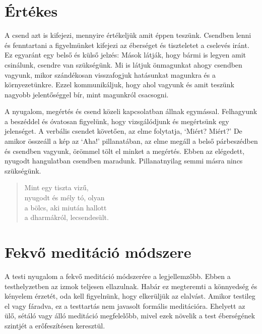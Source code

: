 \section{Értékes}


\noindent A csend azt is kifejezi, mennyire értékeljük amit éppen
teszünk. Csendben lenni és fenntartani a figyelmünket kifejezi az
éberséget és tiszteletet a cselevés iránt. Ez egyaránt egy belső és
külső jelzés: Mások látják, hogy bármi is legyen amit csinálunk, csendre
van szükségünk. Mi is látjuk önmagunkat ahogy csendben vagyunk, mikor
szándékosan visszafogjuk hatásunkat magunkra és a környezetünkre. Ezzel
kommunikáljuk, hogy ahol vagyunk és amit teszünk nagyobb jelentőséggel
bír, mint magunkról csacsogni.

A nyugalom, megértés és csend közeli kapcsolatban állnak egymással.
Felhagyunk a beszéddel és óvatosan figyelünk, hogy vizsgálódjunk és
megértsünk egy jelenséget. A verbális csendet követően, az elme
folytatja, `Miért? Miért?' De amikor összeáll a kép az `Aha!'
pillanatában, az elme megáll a belső párbeszédben és csendben vagyunk,
örömmel tölt el minket a megértés. Ebben az elégedett, nyugodt
hangulatban csendben maradunk. Pillanatnyilag semmi másra nincs
szükségünk.

\begin{quote}
Mint egy tiszta vizű,\\
nyugodt és mély tó, olyan\\
a bölcs, aki miután hallott\\
a dharmákról, lecsendesült.

\bigskip

\end{quote}

\section{Fekvő meditáció módszere}

\noindent A testi nyugalom a fekvő meditáció módszerére a legjellemzőbb.
Ebben a testhelyzetben az izmok teljesen ellazulnak. Habár ez megteremti
a könnyedség és kényelem érzetét, oda kell figyelnünk, hogy elkerüljük
az elalvást. Amikor testileg el vagy fáradva, ez a testtartás nem
javasolt formális meditációra. Ehelyett az ülő, sétáló vagy álló
meditáció megfelelőbb, mivel ezek növelik a test éberségének szintjét a
erőfeszítésen keresztül.

